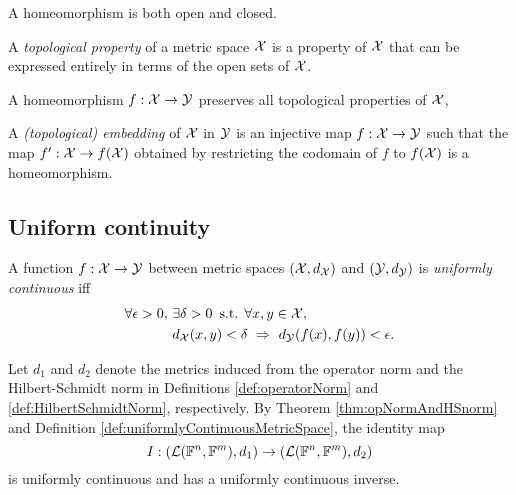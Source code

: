 \begin{lem}
  \label{lem:homeomorphismIsOpenAndClosed}
  A homeomorphism is both open and closed.
\end{lem}


\begin{defn}
  \label{def:topologicalProperty}
  A \emph{topological property} of a metric space ${\cal X}$
  is a property of ${\cal X}$
  that can be expressed entirely in terms of
  the open sets of ${\cal X}$.
\end{defn}

\begin{coro}
  A homeomorphism $f:{\cal X}\rightarrow {\cal Y}$
  preserves all topological properties of ${\cal X}$,
\end{coro}

\begin{defn}
  A \emph{(topological) embedding} of ${\cal X}$ in ${\cal Y}$
  is an injective map $f:{\cal X}\rightarrow{\cal Y}$
  such that the map $f':{\cal X}\rightarrow f({\cal X})$
  obtained by restricting the codomain of $f$ to $f({\cal X})$
  is a homeomorphism.
\end{defn}


\subsection{Uniform continuity}

\begin{defn}
  \label{def:uniformlyContinuousMetricSpace}
  A function $f: {\cal X} \rightarrow {\cal Y}$ between
  metric spaces $({\cal X},d_{\cal X})$ and $({\cal Y}, d_{\cal Y})$ 
  is \emph{uniformly continuous}
  iff
  \begin{align}
    \label{eq:uniformlyContinuousMetricSpace}
    \forall \epsilon>0,\
    & \exists \delta>0\, \text{ s.t. }
      \forall x,y \in {\cal X},\ \
    \\ \nonumber
    &d_{\cal X}(x,y)<\delta\ \Rightarrow\ d_{\cal Y}(f(x),f(y))<\epsilon.
  \end{align}
\end{defn}



\begin{exm}
  \label{exm:identityUniformlyCont}
  Let $d_1$ and $d_2$ denote the metrics
  induced from the operator norm and the Hilbert-Schmidt norm
  in Definitions \ref{def:operatorNorm} and
  \ref{def:HilbertSchmidtNorm}, respectively.
  By Theorem \ref{thm:opNormAndHSnorm}
  and Definition \ref{def:uniformlyContinuousMetricSpace}, 
  the identity map
  \begin{equation}
    \label{eq:identityUniformlyCont}
    I: \left({\cal L}(\mathbb{F}^n,\mathbb{F}^m), d_1\right)
    \rightarrow
    \left({\cal L}(\mathbb{F}^n,\mathbb{F}^m), d_2\right)
  \end{equation}
  is uniformly continuous and has a uniformly continuous inverse.
\end{exm}


